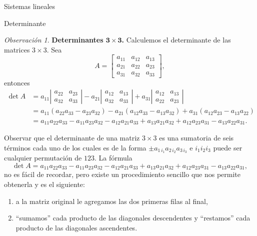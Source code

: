 \documentclass[a4paper,12pt,twoside,spanish,reqno]{amsbook}
\theoremstyle{definition}
\theoremstyle{remark}
\newtheorem{observacion}{Observaci\'on}[section]
\begin{document}
\begin{chapter}{Sistemas lineales}
\begin{section}{Determinante}
	
	\begin{observacion} \textbf{Determinantes $\mathbf{3 \times 3}$.} Calculemos el determinante de las matrices $3 \times 3$. Sea 
		$$A=\begin{bmatrix}a_{11}&a_{12}&a_{13}\\a_{21}&a_{22}&a_{23}\\a_{31}&a_{32}&a_{33}\end{bmatrix},$$  entonces
		\begin{align*}
		\det A &= a_{11}\left|\begin{matrix}a_{22}&a_{23}\\a_{32}&a_{33}\end{matrix}\right|
		- a_{21}\left|\begin{matrix}a_{12}&a_{13}\\a_{32}&a_{33}\end{matrix}\right|
		+ a_{31}\left|\begin{matrix}a_{12}&a_{13}\\a_{22}&a_{23}\end{matrix}\right|\\
		&= a_{11}(a_{22}a_{33}- a_{23}a_{32})
		- a_{21}(a_{12}a_{33}-a_{13}a_{32}) 
		+ a_{31}(a_{12}a_{23} - a_{13}a_{22}) \\
		&=a_{11}a_{22}a_{33}- a_{11}a_{23}a_{32} 
		- a_{12}a_{21}a_{33}+ a_{13}a_{21}a_{32}+ a_{12}a_{23}a_{31}
		- a_{13}a_{22}a_{31}.	
		\end{align*}
		
		Observar que  el determinante de una matriz $3 \times 3$ es una sumatoria de seis términos cada uno de los cuales es de la forma $\pm a_{1\,i_1}a_{2\,i_2}a_{3\,i_3}$ e $i_1i_2i_3$ puede ser cualquier permutación de $123$. La fórmula 
		\begin{equation}\label{det3x3}
		\det A =a_{11}a_{22}a_{33}- a_{11}a_{23}a_{32} 
		- a_{12}a_{21}a_{33}+ a_{13}a_{21}a_{32}+ a_{12}a_{23}a_{31}
		- a_{13}a_{22}a_{31},
		\end{equation} 
		no es fácil de recordar, pero existe un procedimiento sencillo que nos permite obtenerla y es el siguiente: 
		\begin{enumerate}
			\item a la matriz original le agregamos las dos primeras filas al final, 
			\item ``sumamos''  cada producto de las diagonales descendentes y ``restamos'' cada producto de las diagonales ascendentes.
		\end{enumerate}
			

\end{observacion}
\end{section}
\end{chapter}
\end{document}
